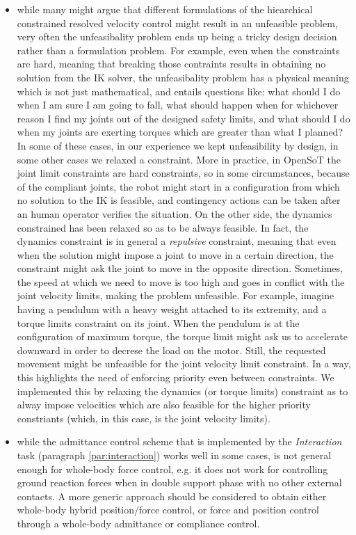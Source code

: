 \documentclass[%
	paper=A4,					%
	twoside=true,				%
	openright,			.
	parskip=full,				%
	chapterprefix=true,			%
	11pt,						%
	headings=normal,			%
	bibliography=totoc,			%
	listof=totoc,				%
	titlepage=on,				%
	captions=tableabove,		%
	draft=true,				%
]{scrreprt}%
\begin{document}
\begin{itemize}
 \item while many might argue that different formulations of the hiearchical constrained resolved velocity control might result in an unfeasible problem, very often the unfeasibality problem ends up being a tricky design decision rather than a formulation problem. For example, even when the constraints are hard, meaning that breaking those contraints results in obtaining no solution from the IK solver, the unfeasibality problem has a physical meaning which is not just mathematical, and entails questions like: what should I do when I am sure I am going to fall, what should happen when for whichever reason I find my joints out of the designed safety limits, and what should I do when my joints are exerting torques which are greater than what I planned? In some of these cases, in our experience we kept unfeasibility by design, in some other cases we relaxed a constraint. More in practice, in OpenSoT the joint limit constraints are hard constraints, so in some circumstances, because of the compliant joints, the robot might start in a configuration from which no solution to the IK is feasible, and contingency actions can be taken after an human operator verifies the situation. On the other side, the dynamics constrained has been relaxed so as to be always feasible. In fact, the dynamics constraint is in general a \emph{repulsive} constraint, meaning that even when the solution might impose a joint to move in a certain direction, the constraint might ask the joint to move in the opposite direction. Sometimes, the speed at which we need to move is too high and goes in conflict with the joint velocity limits, making the problem unfeasible. For example, imagine having a pendulum with a heavy weight attached to its extremity, and a torque limits constraint on its joint. When the pendulum is at the configuration of maximum torque, the torque limit might ask us to accelerate downward in order to decrese the load on the motor. Still, the requested movement might be unfeasible for the joint velocity limit constraint. In a way, this highlights the need of enforcing priority even between constraints. We implemented this by relaxing the dynamics (or torque limits) constraint as to alway impose velocities which are also feasible for the higher priority constriants (which, in this case, is the joint velocity limits).
 \item while the admittance control scheme that is implemented by the \emph{Interaction} task (paragraph \ref{par:interaction}) works well in some cases, is not general enough for whole-body force control, e.g. it does not work for controlling ground reaction forces when in double support phase with no other external contacts. A more generic approach should be considered to obtain either whole-body hybrid position/force control, or force and position control through a whole-body admittance or compliance control.

\end{itemize}
\end{document}
